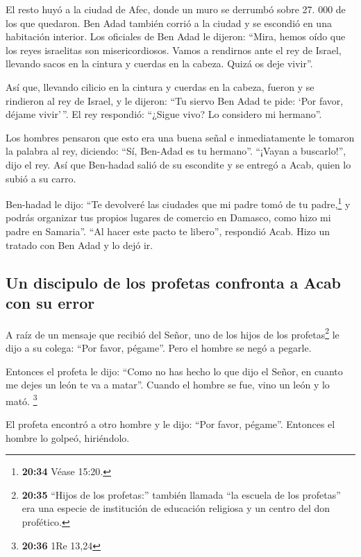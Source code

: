  El resto huyó a la ciudad de Afec, donde un muro se
derrumbó sobre 27. 000 de los que quedaron. Ben Adad también corrió a la
ciudad y se escondió en una habitación interior.  Los
oficiales de Ben Adad le dijeron: ``Mira, hemos oído que los reyes
israelitas son misericordiosos. Vamos a rendirnos ante el rey de Israel,
llevando sacos en la cintura y cuerdas en la cabeza. Quizá os deje
vivir''.

 Así que, llevando cilicio en la cintura y cuerdas en la
cabeza, fueron y se rindieron al rey de Israel, y le dijeron: ``Tu
siervo Ben Adad te pide: `Por favor, déjame vivir'\,''. El rey
respondió: ``¿Sigue vivo? Lo considero mi hermano''.

 Los hombres pensaron que esto era una buena señal e
inmediatamente le tomaron la palabra al rey, diciendo: ``Sí, Ben-Adad es
tu hermano''. ``¡Vayan a buscarlo!'', dijo el rey. Así que Ben-hadad
salió de su escondite y se entregó a Acab, quien lo subió a su carro.

 Ben-hadad le dijo: ``Te devolveré las ciudades que mi
padre tomó de tu padre,\footnote{\textbf{20:34} Véase 15:20.} y podrás
organizar tus propios lugares de comercio en Damasco, como hizo mi padre
en Samaria''. ``Al hacer este pacto te libero'', respondió Acab. Hizo un
tratado con Ben Adad y lo dejó ir.

\hypertarget{un-discipulo-de-los-profetas-confronta-a-acab-con-su-error}{%
\subsection{Un discipulo de los profetas confronta a Acab con su
error}\label{un-discipulo-de-los-profetas-confronta-a-acab-con-su-error}}

 A raíz de un mensaje que recibió del Señor, uno de los
hijos de los profetas\footnote{\textbf{20:35} ``Hijos de los profetas:''
  también llamada ``la escuela de los profetas'' era una especie de
  institución de educación religiosa y un centro del don profético.} le
dijo a su colega: ``Por favor, pégame''. Pero el hombre se negó a
pegarle.

 Entonces el profeta le dijo: ``Como no has hecho lo que
dijo el Señor, en cuanto me dejes un león te va a matar''. Cuando el
hombre se fue, vino un león y lo mató. \footnote{\textbf{20:36} 1Re
  13,24}

 El profeta encontró a otro hombre y le dijo: ``Por
favor, pégame''. Entonces el hombre lo golpeó, hiriéndolo.

